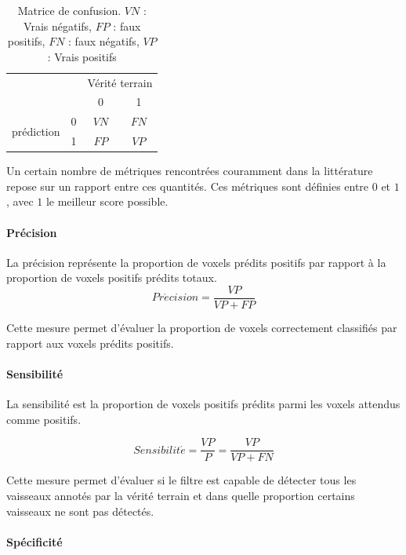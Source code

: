 \begin{table}
  \centering
  \begin{tabular}{ cccc }
    \hline
                                      &   &\multicolumn{2}{c}{Vérité terrain} \\
                                      &   & 0  & 1 \\
      \multirow{2}{*}{prédiction}     & 0 & $VN$ & $FN$ \\
                                      & 1 & $FP$ & $VP$  \\
    \hline
  \end{tabular}
  \caption{Matrice de confusion. $VN$ : Vrais négatifs, $FP$ : faux positifs, $FN$ : faux négatifs, $VP$ : Vrais positifs}
  \label{tab:confusion_matrix}
\end{table}

Un certain nombre de métriques rencontrées couramment dans la littérature repose sur un rapport entre ces quantités. Ces métriques sont définies entre $0$ et $1$, avec $1$ le meilleur score possible. 

\paragraph{Précision}
La précision représente la proportion de voxels prédits positifs par rapport à la proportion de voxels positifs prédits totaux.
\begin{equation}
  Pr\acute{e}cision = \frac{VP}{VP+FP}
\end{equation}

Cette mesure permet d'évaluer la proportion de voxels correctement classifiés par rapport aux voxels prédits positifs.

\paragraph{Sensibilité}

La sensibilité est la proportion de voxels positifs prédits parmi les voxels attendus comme positifs.

\begin{equation}
  Sensibilit\acute{e} = \frac{VP}{P} = \frac{VP}{VP+FN}
\end{equation}

Cette mesure permet d'évaluer si le filtre est capable de détecter tous les vaisseaux annotés par la vérité terrain et dans quelle proportion certains vaisseaux ne sont pas détectés. 

\paragraph{Spécificité}

